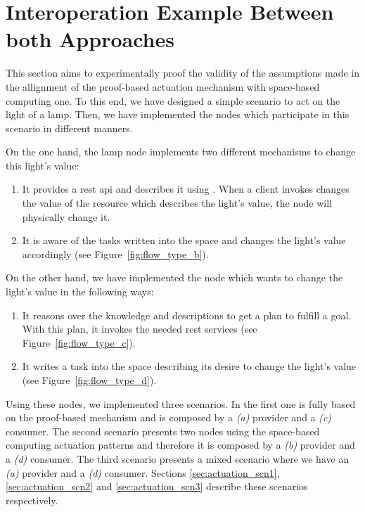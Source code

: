 \section{Interoperation Example Between both Approaches}

This section aims to experimentally proof the validity of the assumptions made in the allignment of the proof-based actuation mechanism with space-based computing one.
To this end, we have designed a simple scenario to act on the light of a lamp.
Then, we have implemented the nodes which participate in this scenario in different manners.


On the one hand, the lamp node implements two different mechanisms to change this light's value:
\begin{enumerate}[label=\itshape(\alph*\upshape)]
  \item It provides a \ac{rest} \ac{api} and describes it using \restdesc{}. %
        When a client invokes changes the value of the resource which describes the light's value, the node will physically change it.
  \item It is aware of the tasks written into the space and changes the light's value accordingly (see Figure~\ref{fig:flow_type_b}). %
\end{enumerate}


On the other hand, we have implemented the node which wants to change the light's value in the following ways:
\begin{enumerate}[resume,label=\itshape(\alph*\upshape)]
  \item It reasons over the knowledge and descriptions to get a plan to fulfill a goal.
	With this plan, it invokes the needed \ac{rest} services (see Figure~\ref{fig:flow_type_c}).
  \item It writes a task into the space describing its desire to change the light's value (see Figure~\ref{fig:flow_type_d}).
\end{enumerate}


Using these nodes, we implemented three scenarios.
In the first one is fully based on the proof-based mechanism and is composed by a \emph{(a)} provider and a \emph{(c)} consumer.
The second scenario presents two nodes using the space-based computing actuation patterns and therefore it is composed by a \emph{(b)} provider and a \emph{(d)} consumer.
The third scenario presents a mixed scenario where we have an \emph{(a)} provider and a \emph{(d)} consumer.
Sections \ref{sec:actuation_scn1}, \ref{sec:actuation_scn2} and \ref{sec:actuation_scn3} describe these scenarios respectively.


